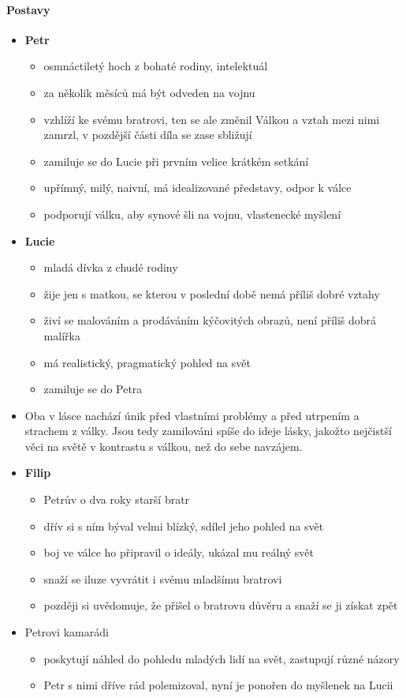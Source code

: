 \documentclass[10pt,a4paper]{article}
\begin{document}
\paragraph{Postavy}
\begin{itemize}
\item \textbf{Petr}
	\begin{itemize}
	\item osmnáctiletý hoch z bohaté rodiny, intelektuál
	\item za několik měsíců má být odveden na vojnu 
	\item vzhlíží ke svému bratrovi, ten se ale změnil Válkou a vztah mezi nimi zamrzl, v pozdější části díla se zase sbližují
	\item zamiluje se do Lucie při prvním velice krátkém setkání
	\item upřímný, milý, naivní, má idealizované představy, odpor k válce
	\item podporují válku, aby synové šli na vojnu, vlastenecké myšlení
	\end{itemize}
\item \textbf{Lucie}
	\begin{itemize}
	\item mladá dívka z chudé rodiny
	\item žije jen s matkou, se kterou v poslední době nemá příliš dobré vztahy
	\item živí se malováním a prodáváním kýčovitých obrazů, není příliš dobrá malířka
	\item má realistický, pragmatický pohled na svět
	\item zamiluje se do Petra
	\end{itemize}
\item Oba v lásce nachází únik před vlastními problémy a před utrpením a strachem z války. Jsou tedy zamilováni spíše do ideje lásky, jakožto nejčistší věci na světě v kontrastu s válkou, než do sebe navzájem. 
\item \textbf{Filip} 
	\begin{itemize}
	\item Petrův o dva roky starší bratr
	\item dřív si s ním býval velmi blízký, sdílel jeho pohled na svět
	\item boj ve válce ho připravil o ideály, ukázal mu reálný svět
	\item snaží se iluze vyvrátit i svému mladšímu bratrovi
	\item později si uvědomuje, že přišel o bratrovu důvěru a snaží se ji získat zpět
	\end{itemize}
\item Petrovi kamarádi
	\begin{itemize}
	\item poskytují náhled do pohledu mladých lidí na svět, zastupují různé názory
	\item Petr s nimi dříve rád polemizoval, nyní je ponořen do myšlenek na Lucii
	\end{itemize}
\end{itemize}
\end{document}
